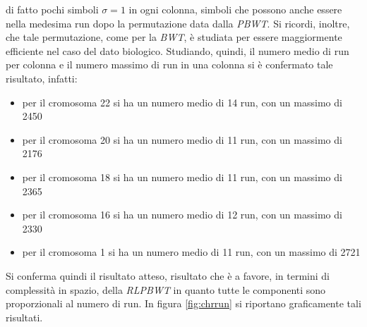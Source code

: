 di fatto pochi simboli $\sigma=1$ in ogni colonna, simboli che possono anche
essere nella medesima run dopo la permutazione data dalla
\textit{PBWT}. Si ricordi, inoltre, che tale permutazione, come per la
\textit{BWT}, è studiata per essere 
maggiormente efficiente nel caso del dato biologico. Studiando, quindi, il
numero medio di run per colonna e il numero 
massimo di run in una colonna si è confermato tale risultato, infatti:
\begin{itemize}
  \item per il cromosoma 22 si ha un numero medio di 14 run, con un massimo di
  2450
  \item per il cromosoma 20 si ha un numero medio di 11 run, con un massimo di
  2176
  \item per il cromosoma 18 si ha un numero medio di 11 run, con un massimo di
  2365
  \item per il cromosoma 16 si ha un numero medio di 12 run, con un massimo di
  2330
  \item per il cromosoma 1 si ha un numero medio di 11 run, con un massimo di
  2721 
\end{itemize}
Si conferma quindi il risultato atteso, risultato che è a favore, in termini di
complessità in spazio, della \textit{RLPBWT} in quanto tutte le componenti sono
proporzionali al numero di run. In figura \ref{fig:chrrun} si riportano
graficamente tali risultati.
